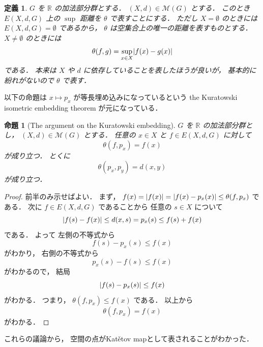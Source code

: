 \documentclass[leqno, 12pt]{jsarticle}
\newtheorem{prop}[thm]{命題}
\newtheorem{df}[thm]{定義}
\newcommand{\rr}{\mathbb{R}}
\DeclarePairedDelimiter{\abs}{\lvert}{\rvert}
\newcommand{\Met}[1]{\mathscr{M}(#1)}
\newcommand{\Espace}[3]{E(#1,#2,#3)}
\newcommand{\KatDist}{\theta}
\newcommand{\kura}[1]{p_{#1}}
\begin{document}
\begin{df}\label{df:katetov:supmetric}
$G$
を
$\rr$
の加法部分群とする．
$(X, d)\in \Met{G}$
とする．
このとき
$\Espace{X}{d}{G}$
上の
$\sup$
距離を
$\KatDist$
で表すことにする．
ただし
$X=\emptyset$
のときには
$\Espace{X}{d}{G}=\emptyset$
であるから，
$\KatDist$
は空集合上の唯一の距離を表すものとする．
$X\neq\emptyset$
のときには
\[
\KatDist(f, g)=\sup_{x\in X}\abs{f(x)-g(x)}
\]
である．
本来は
$X$
や
$d$
に依存していることを表したほうが良いが，
基本的に紛れがないので
$\KatDist$
で表す．
\end{df}


以下の命題は
$x\mapsto \kura{x}$
が等長埋め込みになっているという
the
Kuratowski isometric embedding theorem
が元になっている．

\begin{prop}[The argument on the Kuratowski embedding]\label{prop:katetov:Kuratowski}
$G$
を
$\rr$
の加法部分群とし，
$(X, d)\in \Met{G}$%
とする．
任意の
$x\in X$
と
$f\in \Espace{X}{d}{G}$
に対して
\[
\KatDist(f, \kura{x})=f(x)
\]
が成り立つ．
とくに
\[
\KatDist(\kura{x}, \kura{y})=d(x, y)
\]
が成り立つ．
\end{prop}
\begin{proof}
前半のみ示せばよい．
まず，
$f(x)=\abs{f(x)}=\abs{f(x)-\kura{x}(x)}\le \KatDist(f, \kura{x})$
である．
次に
$f\in \Espace{X}{d}{G}$%
であることから
任意の%
$s\in X$%
について
\[
\abs{f(s)-f(x)}\le d(x, s)=\kura{x}(s)\le f(s)+f(x)
\]
である．
よって
左側の不等式から
\[
f(s)-\kura{x}(s)\le f(x)
\]
がわかり，
右側の不等式から
\[
\kura{x}(s)-f(s)\le f(x)
\]
がわかるので，
結局
\[
\abs{f(s)-\kura{x}(s)}\le f(x)
\]
がわかる．
つまり，
$\KatDist(f, \kura{x})\le f(x)$%
である．
以上から
\[
\KatDist(f, \kura{x})=f(x)
\]
がわかる．
\end{proof}
これらの議論から，
空間の点がKat\v{e}tov mapとして表されることがわかった．
\end{document}
